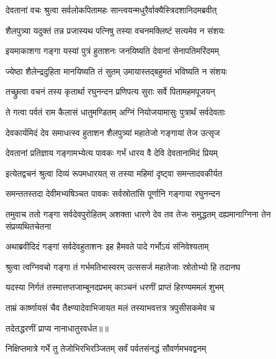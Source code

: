\twolineshloka
{देवतानां वचः श्रुत्वा सर्वलोकपितामहः}
{सान्त्वयन्मधुरैर्वाक्यैस्त्रिदशानिदमब्रवीत्} %

\twolineshloka
{शैलपुत्र्या यदुक्तं तन्न प्रजास्यथ पत्निषु}
{तस्या वचनमक्लिष्टं सत्यमेव न संशयः} %

\twolineshloka
{इयमाकाशगा गङ्गा यस्यां पुत्रं हुताशनः}
{जनयिष्यति देवानां सेनापतिमरिंदमम्} %

\twolineshloka
{ज्येष्ठा शैलेन्द्रदुहिता मानयिष्यति तं सुतम्}
{उमायास्तद्बहुमतं भविष्यति न संशयः} %

\twolineshloka
{तच्छ्रुत्वा वचनं तस्य कृतार्था रघुनन्दन}
{प्रणिपत्य सुराः सर्वे पितामहमपूजयन्} %

\twolineshloka
{ते गत्वा पर्वतं राम कैलासं धातुमण्डितम्}
{अग्निं नियोजयामासुः पुत्रार्थं सर्वदेवताः} %

\twolineshloka
{देवकार्यमिदं देव समाधत्स्व हुताशन}
{शैलपुत्र्यां महातेजो गङ्गायां तेज उत्सृज} %

\twolineshloka
{देवतानां प्रतिज्ञाय गङ्गामभ्येत्य पावकः}
{गर्भं धारय वै देवि देवतानामिदं प्रियम्} %

\twolineshloka
{इत्येतद्वचनं श्रुत्वा दिव्यं रूपमधारयत्}
{स तस्या महिमां दृष्ट्वा समन्तादवकीर्यत} %

\twolineshloka
{समन्ततस्तदा देवीमभ्यषिञ्चत पावकः}
{सर्वस्रोतांसि पूर्णानि गङ्गाया रघुनन्दन} %

\threelineshloka
{तमुवाच ततो गङ्गा सर्वदेवपुरोहितम्}
{अशक्ता धारणे देव तव तेजः समुद्धतम्}
{दह्यमानाग्निना तेन संप्रव्यथितचेतना} %

\twolineshloka
{अथाब्रवीदिदं गङ्गां सर्वदेवहुताशनः}
{इह हैमवते पादे गर्भोऽयं संनिवेश्यताम्} %

\twolineshloka
{श्रुत्वा त्वग्निवचो गङ्गा तं गर्भमतिभास्वरम्}
{उत्ससर्ज महातेजाः स्रोतोभ्यो हि तदानघ} %

\twolineshloka
{यदस्या निर्गतं तस्मात्तप्तजाम्बूनदप्रभम्}
{काञ्चनं धरणीं प्राप्तं हिरण्यममलं शुभम्} %

\twolineshloka
{ताम्रं कार्ष्णायसं चैव तैक्ष्ण्यादेवाभिजायत}
{मलं तस्याभवत्तत्र त्रपुसीसकमेव च} %

{तदेतद्धरणीं प्राप्य नानाधातुरवर्धत॥॥} %

\addtocounter{shlokacount}{1}

\twolineshloka
{निक्षिप्तमात्रे गर्भे तु तेजोभिरभिरञ्जितम्}
{सर्वं पर्वतसंनद्धं सौवर्णमभवद्वनम्} %

